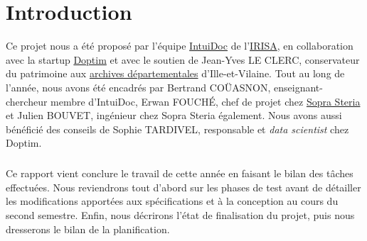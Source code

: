 \chapter{Introduction}
\pagestyle{fancy}
\fancyhf{}

Ce projet nous a été proposé par l’équipe \href{https://www-intuidoc.irisa.fr/}{IntuiDoc} de l’\href{https://www.irisa.fr/}{IRISA}, en collaboration avec la startup \href{http://www.doptim.eu}{Doptim} et avec le soutien de Jean-Yves LE CLERC, conservateur du patrimoine aux \href{http://archives.ille-et-vilaine.fr/fr}{archives départementales} d'Ille-et-Vilaine. Tout au long de l’année, nous avons été encadrés par Bertrand COÜASNON, enseignant-chercheur membre d'IntuiDoc, Erwan FOUCHÉ, chef de projet chez \href{https://www.soprasteria.com/fr}{Sopra Steria} et Julien BOUVET, ingénieur chez Sopra Steria également. Nous avons aussi bénéficié des conseils de Sophie TARDIVEL, responsable et \textit{data scientist} chez Doptim.

\paragraph{}
Ce rapport vient conclure le travail de cette année en faisant le bilan des tâches effectuées. Nous reviendrons tout d'abord sur les phases de test avant de détailler les modifications apportées aux spécifications et à la conception au cours du second semestre. Enfin, nous décrirons l'état de finalisation du projet, puis nous dresserons le bilan de la planification.